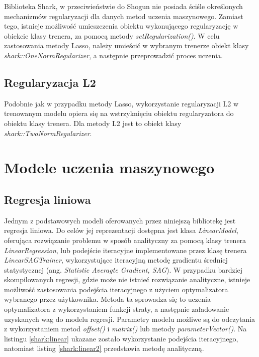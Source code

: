 Biblioteka Shark, w przeciwieństwie do Shogun nie posiada ściśle określonych mechanizmów regularyzacji dla danych metod uczenia maszynowego. Zamiast tego, istnieje możliwość umieszczenia obiektu wykonującego regularyzację w obiekcie klasy trenera, za pomocą metody \textit{setRegularization()}. W celu zastosowania metody Lasso, należy umieścić w wybranym trenerze obiekt klasy \textit{shark::OneNormRegularizer}, a następnie przeprowadzić proces uczenia.

\subsection{Regularyzacja L2}

Podobnie jak w przypadku metody Lasso, wykorzystanie regularyzacji L2 w trenowanym modelu opiera się na wstrzyknięciu obiektu regularyzatora do obiektu klasy trenera. Dla metody L2 jest to obiekt klasy \textit{shark::TwoNormRegularizer}.


\section{Modele uczenia maszynowego}

\subsection{Regresja liniowa}

Jednym z podstawowych modeli oferowanych przez niniejszą bibliotekę jest regresja liniowa. Do celów jej reprezentacji dostępna jest klasa \textit{LinearModel}, oferująca rozwiązanie problemu w sposób analityczny za pomocą klasy trenera \textit{LinearRegression}, lub podejście iteracyjne implementowane przez klasę trenera \textit{LinearSAGTrainer}, wykorzystujące iteracyjną metodę gradientu średniej statystycznej (ang. \textit{Statistic Averagte Gradient, SAG}). W przypadku bardziej skompilowanych regresji, gdzie może nie istnieć rozwiązanie analityczne, istnieje możliwość zastosowania podejścia iteracyjnego z użyciem optymalizatora wybranego przez użytkownika. Metoda ta sprowadza się to uczenia optymalizatora z wykorzystaniem funkcji straty, a następnie załadowanie uzyskanych wag do modelu regresji. Parametry modelu możliwe są do odczytania z wykorzystaniem metod \textit{offset()} i \textit{matrix()} lub metody \textit{parameterVector()}. Na listingu \ref{shark:linear} ukazane zostało wykorzystanie podejścia iteracyjnego, natomiast listing \ref{shark:linear2} przedstawia metodę analityczną.

